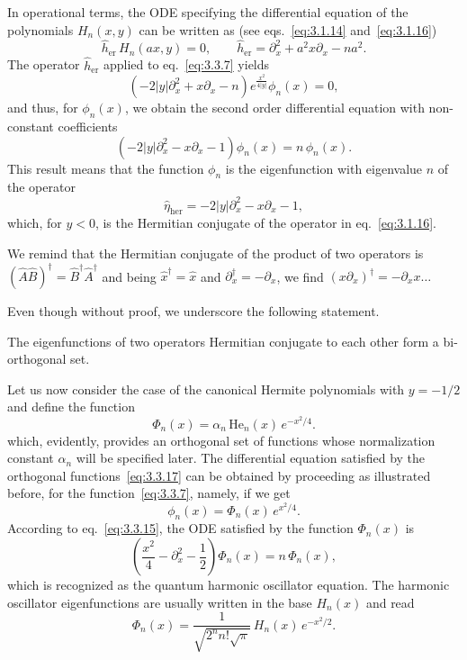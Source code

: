 In operational terms, the ODE specifying the differential equation of
the polynomials $H_n(x,y)$ can be written as (see
eqs.~\eqref{eq:3.1.14} and~\eqref{eq:3.1.16})
\[
\hat h_{\mathrm{er}}\,H_n(ax,y)=0,\qquad
\hat h_{\mathrm{er}}=\partial_x^2+a^2x\partial_x-n a^2.
\]
The operator $\hat h_{\mathrm{er}}$ applied to eq.~\eqref{eq:3.3.7}
yields
\[
\left(-2|y|\partial_x^2+x\partial_x-n\right)e^{\frac{x^2}{4|y|}}\phi_n(x)=0,
\]
and thus, for $\phi_n(x)$, we obtain the second order differential
equation with non-constant coefficients
\begin{equation}
\left(-2|y|\partial_x^2-x\partial_x-1\right)\phi_n(x)=n\,\phi_n(x).
\label{eq:3.3.15}
\end{equation}
This result means that the function $\phi_n$ is the eigenfunction
with eigenvalue $n$ of the operator
\begin{equation}
\hat\eta_{\mathrm{her}}=-2|y|\partial_x^2-x\partial_x-1,
\label{eq:3.3.16}
\end{equation}
which, for $y<0$, is the Hermitian conjugate of the
operator in eq.~\eqref{eq:3.1.16}.

 We remind that the Hermitian conjugate of
the product of two operators is
$(\hat A\hat B)^\dagger=\hat B^\dagger\hat A^\dagger$ and being
$\hat x^\dagger=\hat x$ and $\partial_x^\dagger=-\partial_x$, we find
$(x\partial_x)^\dagger=-\partial_x x\ldots$

\medskip
Even though without proof, we underscore the following statement.

\begin{proposition}
The eigenfunctions of two operators Hermitian conjugate to each
other form a bi-orthogonal set.
\end{proposition}

Let us now consider the case of the canonical Hermite polynomials
with $y=-1/2$ and define the function
\begin{equation}
\Phi_n(x)=\alpha_n\,\mathrm{He}_n(x)\,e^{-x^2/4}.
\label{eq:3.3.17}
\end{equation}
which, evidently, provides an orthogonal set of functions whose
normalization constant $\alpha_n$ will be specified later. The
differential equation satisfied by the orthogonal
functions~\eqref{eq:3.3.17} can be obtained by proceeding as
illustrated before, for the function~\eqref{eq:3.3.7}, namely, if we
get
\[
\phi_n(x)=\Phi_n(x)\,e^{x^2/4}.
\]
According to eq.~\eqref{eq:3.3.15}, the ODE satisfied by the
function $\Phi_n(x)$ is
\begin{equation}
\left(\frac{x^2}{4}-\partial_x^2-\frac{1}{2}\right)\Phi_n(x)
=n\,\Phi_n(x),
\label{eq:3.3.19}
\end{equation}
which is recognized as the quantum harmonic oscillator equation. The
harmonic oscillator eigenfunctions are usually written in the base
$H_n(x)$ and read
\begin{equation}
\Phi_n(x)=\frac{1}{\sqrt{2^n n!\sqrt{\pi}}}\,
H_n(x)\,e^{-x^2/2}.
\label{eq:3.3.20}
\end{equation}

